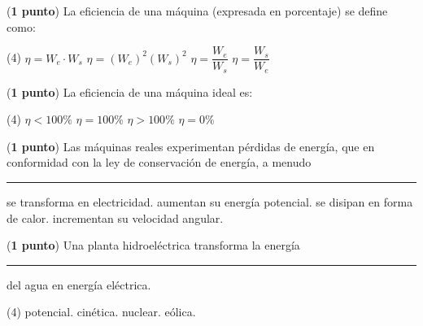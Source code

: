 \documentclass[12pt, letter]{exam}
\begin{document}
\begin{questions}
    \question (\textbf{1 punto}) La eficiencia de una máquina (expresada en porcentaje) se define como:
    \begin{tasks}(4)
        \task $\eta = W_{e} \cdot W_{s}$
        \task $\eta = (W_{e})^2 (W_{s})^2$
        \task $\eta = \dfrac{W_{e}}{W_{s}}$
        \task $\eta = \dfrac{W_{s}}{W_{e}}$
    \end{tasks}
    \question (\textbf{1 punto}) La eficiencia de una máquina ideal es:
    \begin{tasks}(4)
        \task $\eta < 100 \%$
        \task $\eta = 100 \%$
        \task $\eta > 100 \%$
        \task $\eta = 0 \%$
    \end{tasks}
    \question (\textbf{1 punto}) Las máquinas reales experimentan pérdidas de energía, que en conformidad con la ley de conservación de energía, a menudo \rule{2cm}{0.1mm}
    \begin{multicols}{2}
    \begin{tasks}
        \task se transforma en electricidad.
        \task aumentan su energía potencial.
        \task se disipan en forma de calor.
        \task incrementan su velocidad angular.
    \end{tasks}
    \end{multicols}
    \question (\textbf{1 punto}) Una planta hidroeléctrica transforma la energía \rule{2cm}{0.1mm} del agua en energía eléctrica.
    \begin{tasks}(4)
        \task potencial.
        \task cinética.
        \task nuclear.
        \task eólica.
    \end{tasks}
\end{questions}

\newpage
\end{document}
